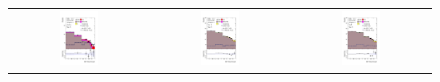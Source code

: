 \documentclass[PAPER, coverpage, atlasdraft=true, texlive=2016, UKenglish]{\ATLASLATEXPATH atlasdoc}
\providecommand{\DIFaddbeginFL}{} %
\providecommand{\DIFaddendFL}{} %
\providecommand{\DIFdelbeginFL}{} %
\providecommand{\DIFdelendFL}{} %
\begin{document}
\begin{figure}[H]
\begin{tabular}{@{}ccc@{}}
\DIFdelbeginFL %
\DIFdelendFL \DIFaddbeginFL \includegraphics[width=0.3\textwidth]{figures/tcH_reg1l2tau1bnj_os.pdf}\DIFaddendFL &
\DIFdelbeginFL %
\DIFdelendFL \DIFaddbeginFL \includegraphics[width=0.3\textwidth]{figures/tcH_reg1l1tau1b1j_ss.pdf}\DIFaddendFL &
\DIFdelbeginFL %
\DIFdelendFL \DIFaddbeginFL \includegraphics[width=0.3\textwidth]{figures/tcH_reg1l1tau1b2j_ss.pdf}\DIFaddendFL \\

\end{tabular}
\end{figure}
\end{document}
